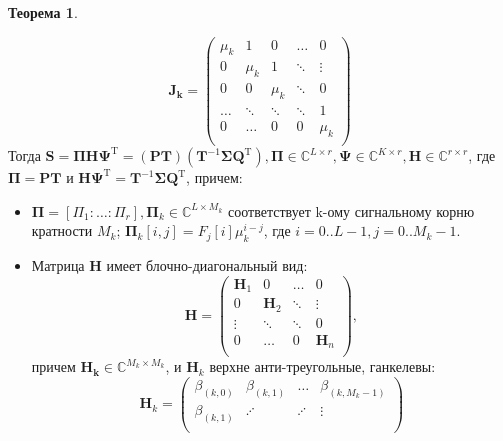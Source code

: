 \documentclass[specialist, substylefile = spbureport.rtx, subf,href,colorlinks=true, 12pt]{disser}
\theoremstyle{definition}
\newtheorem{theorem}{Теорема}
\begin{document}
\begin{theorem}
\begin{enumerate}
\begin{equation*}
            \mathbf{J_k} =         \begin{pmatrix}
                    \mu_k & 1 & 0 & \ldots & 0 \\
                    0 & \mu_k & 1 & \ddots & \vdots \\
                    0 & 0 & \mu_k & \ddots & 0 \\
                    \ldots & \ddots & \ddots & \ddots & 1 \\
                    0 & \ldots & 0 & 0 & \mu_k \\
                    \end{pmatrix}
        \end{equation*}
        Тогда $\mathbf{S} = \mathbf{\Pi H\Psi}^{\mathrm{T}} = (\mathbf{PT})(\mathbf{T}^{-1}\mathbf{\Sigma Q}^{\mathrm{T}}), \mathbf{\Pi} \in \mathbb{C}^{L \times r}, \mathbf{\Psi} \in \mathbb{C}^{K \times r}, \mathbf{H} \in \mathbb{C}^{r \times r}$, где $\mathbf{\Pi} = \mathbf{PT}$ и $\mathbf{H\Psi}^{\mathrm{T}} = \mathbf{T}^{-1}\mathbf{\Sigma Q}^{\mathrm{T}}$, причем:
        \begin{itemize}
            \item $\mathbf{\Pi} = [\Pi_1: \ldots :\Pi_r], \mathbf{\Pi}_k \in \mathbb{C}^{L \times M_k}$ соответствует k-ому сигнальному корню кратности $M_k$; $\mathbf{\Pi}_k[i, j] = F_j[i]\mu_k^{i - j}$, где $i = 0..L-1, j = 0..M_k-1$.
            \item Матрица $\mathbf{H}$ имеет блочно-диагональный вид:
            \begin{equation*}
                \mathbf{H} = \begin{pmatrix}
                    \mathbf{H}_1 & 0 & \ldots & 0\\
                    0 & \mathbf{H}_2 & \ddots & \vdots \\
                    \vdots & \ddots & \ddots & 0 \\
                    0 & \ldots & 0 & \mathbf{H}_n \\
                    \end{pmatrix},
            \end{equation*}
            причем $\mathbf{H_k} \in \mathbb{C}^{M_k \times M_k}$, и $\mathbf{H}_k$ верхне анти-треугольные, ганкелевы:
            \begin{equation*}
                \mathbf{H}_k = \begin{pmatrix}
                    \beta _{(k, 0)} & \beta _{(k, 1)} & \ldots & \beta _{(k, M_k - 1)}\\
                    \beta _{(k, 1)} & \iddots & \iddots & \vdots \\

\end{pmatrix}
\end{equation*}
\end{itemize}
\end{enumerate}
\end{theorem}
\end{document}
